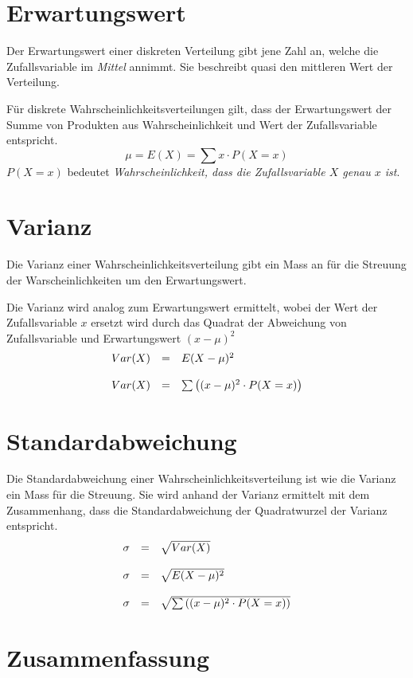 \section{Erwartungswert}
Der Erwartungswert einer diskreten Verteilung gibt jene Zahl an,
welche die Zufallsvariable im \emph{Mittel} annimmt. Sie beschreibt
quasi den mittleren Wert der Verteilung.

Für diskrete Wahrscheinlichkeitsverteilungen gilt, dass der 
Erwartungswert der Summe von Produkten aus Wahrscheinlichkeit und
Wert der Zufallsvariable entspricht. 
\[ \mu = E(X) = \sum x \cdot P(X=x) \]
$P(X=x)$ bedeutet \emph{Wahrscheinlichkeit, dass die Zufallsvariable $X$ 
genau $x$ ist}.


\section{Varianz}
Die Varianz einer Wahrscheinlichkeitsverteilung gibt ein Mass an für 
die Streuung der Warscheinlichkeiten um den Erwartungswert.

Die Varianz wird analog zum Erwartungswert ermittelt, wobei der Wert
der Zufallsvariable $x$ ersetzt wird durch das Quadrat der Abweichung
von Zufallsvariable und Erwartungswert $(x-\mu)^2$
\[ \begin{array}{l c l}
	Var(X) 
		& = 
		& E(X-\mu)^2 \\
	& &  \\
	Var(X)
		& = 
		& \sum \left( (x-\mu)^2 \cdot P(X=x) \right)
\end{array} \]

\section{Standardabweichung}
Die Standardabweichung einer Wahrscheinlichkeitsverteilung 
ist wie die Varianz ein Mass für die Streuung. Sie 
wird anhand der Varianz ermittelt mit dem Zusammenhang, dass die 
Standardabweichung der Quadratwurzel der Varianz entspricht.
\[ \begin{array}{l c l} 
	\sigma 
		& = 
		& \sqrt{Var(X)} \\
	& & \\
	\sigma
		& =
		& \sqrt{E(X-\mu)^2} \\
	& & \\
	\sigma
		& =
		& \sqrt{\sum \left( (x-\mu)^2 \cdot P(X=x) \right)}
\end{array} \]

\section{Zusammenfassung}

